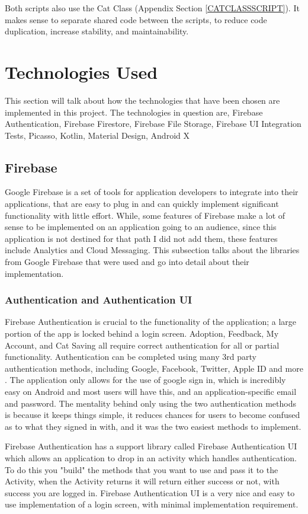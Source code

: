     Both scripts also use the Cat Class (Appendix Section \ref{CATCLASSSCRIPT}). It makes sense to separate shared code between the scripts, to reduce code duplication, increase stability, and maintainability.

\section{Technologies Used}
This section will talk about how the technologies that have been chosen are implemented in this project. The technologies in question are, Firebase Authentication, Firebase Firestore, Firebase File Storage, Firebase UI Integration Tests, Picasso, Kotlin, Material Design, Android X
    \subsection{Firebase}
    Google Firebase is a set of tools for application developers to integrate into their applications, that are easy to plug in and can quickly implement significant functionality with little effort. While, some features of Firebase make a lot of sense to be implemented on an application going to an audience, since this application is not destined for that path I did not add them, these features include Analytics and Cloud Messaging. This subsection talks about the libraries from Google Firebase that were used and go into detail about their implementation.
        \subsubsection{Authentication and Authentication UI} \label{FIREBASEAUTHENTICATION}
        Firebase Authentication is crucial to the functionality of the application; a large portion of the app is locked behind a login screen. Adoption, Feedback, My Account, and Cat Saving all require correct authentication for all or partial functionality. Authentication can be completed using many 3rd party authentication methods, including Google, Facebook, Twitter, Apple ID and more \cite{FIREBASEAUTHTYPES}. The application only allows for the use of google sign in, which is incredibly easy on Android and most users will have this, and an application-specific email and password. The mentality behind only using the two authentication methods is because it keeps things simple, it reduces chances for users to become confused as to what they signed in with, and it was the two easiest methods to implement.
        
        Firebase Authentication has a support library called Firebase Authentication UI which allows an application to drop in an activity which handles authentication. To do this you "build" the methods that you want to use and pass it to the Activity, when the Activity returns it will return either success or not, with success you are logged in. Firebase Authentication UI is a very nice and easy to use implementation of a login screen, with minimal implementation requirement.
        
